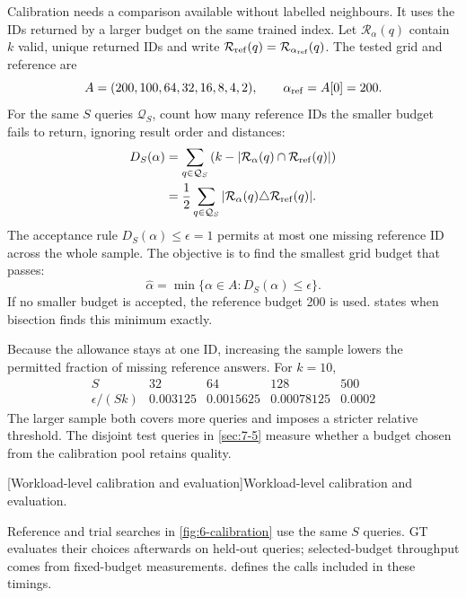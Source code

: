 Calibration needs a comparison available without labelled neighbours.
It uses the IDs returned by a larger budget on the same trained index.
Let $\mathcal R_\alpha(q)$ contain $k$ valid, unique returned IDs and
write $\mathcal R_{\rm ref}(q)=\mathcal R_{\alpha_{\rm ref}}(q)$. The
tested grid and reference are
\begin{equation}
 A=(200,100,64,32,16,8,4,2),\qquad \alpha_{\rm ref}=A[0]=200.
 \label{eq:6-grid}
\end{equation}
For the same $S$ queries $\mathcal Q_S$, count how many reference IDs
the smaller budget fails to return, ignoring result order and distances:
\begin{equation}
 \begin{aligned}
 D_S(\alpha)
 &=\sum_{q\in\mathcal Q_S}
   \left(k-|\mathcal R_\alpha(q)\cap\mathcal R_{\rm ref}(q)|\right)\\
 &=\frac12\sum_{q\in\mathcal Q_S}
   |\mathcal R_\alpha(q)\triangle\mathcal R_{\rm ref}(q)|.
 \end{aligned}
 \label{eq:6-agreement}
\end{equation}
The acceptance rule $D_S(\alpha)\leq\epsilon=1$ permits at most one
missing reference ID across the whole sample. The objective is to find
the smallest grid budget that passes:
\begin{equation}
 \widehat\alpha=\min\{\alpha\in A:D_S(\alpha)\leq\epsilon\}.
 \label{eq:6-selection-objective}
\end{equation}
If no smaller budget is accepted, the reference budget 200 is used.
 states when bisection finds this minimum exactly.

Because the allowance stays at one ID, increasing the sample lowers
the permitted fraction of missing reference answers. For $k=10$,
\[
 \begin{array}{c|rrrr}S&32&64&128&500\\\hline
 \epsilon/(Sk)&0.003125&0.0015625&0.00078125&0.0002
 \end{array}
\]
The larger sample both covers more queries and imposes a stricter
relative threshold. The disjoint test queries in \cref{sec:7-5} measure
whether a budget chosen from the calibration pool retains quality.

\par\medskip\noindent\begin{minipage}{\linewidth}
\captionsetup{hypcap=false}
\centering

[Workload-level calibration and evaluation]{Workload-level calibration and evaluation.}
\label{fig:6-calibration}
\end{minipage}\par\medskip
Reference and trial searches in \cref{fig:6-calibration} use the same
$S$ queries. GT evaluates their choices afterwards on held-out queries;
selected-budget throughput comes from fixed-budget measurements.
 defines the calls included in these timings.

